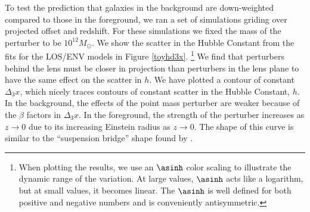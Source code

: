 To test the prediction that galaxies in the background are down-weighted compared to those in the foreground, we ran a set of simulations griding over projected offset and redshift. For these simulations we fixed the mass of the perturber to be $10^{12} M_\odot$. We show the scatter in the Hubble Constant from the fits for the LOS/ENV models in Figure \ref{toyhd3x}. \footnote{When plotting the results, we use an $\asinh$ color scaling to illustrate the dynamic range of the variation. At large values, $\asinh$ acts like a logarithm, but at small values, it becomes linear. The $\asinh$ is well defined for both positive and negative numbers and is conveniently antisymmetric.} We find that perturbers behind the lens must be closer in projection than perturbers in the lens plane to have the same effect on the scatter in $h$. We have plotted a contour of constant $\Delta_3 x$, which nicely traces contours of constant scatter in the Hubble Constant, $h$. In the background, the effects of the point mass perturber are weaker because of the $\beta$ factors in $\Delta_3 x$. In the foreground, the strength of the perturber increases as $z \rightarrow 0$ due to its increasing Einstein radius as $z \rightarrow 0$. The shape of this curve is similar to the ``suspension bridge'' shape found by \citet{Momcheva06}.